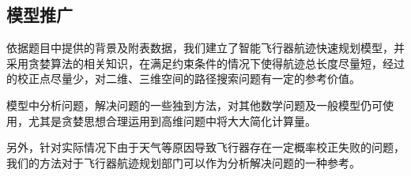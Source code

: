 \subsection{模型推广}

依据题目中提供的背景及附表数据，我们建立了智能飞行器航迹快速规划模型，并采用贪婪算法的相关知识，在满足约束条件的情况下使得航迹总长度尽量短，经过的校正点尽量少，对二维、三维空间的路径搜索问题有一定的参考价值。

模型中分析问题，解决问题的一些独到方法，对其他数学问题及一般模型仍可使用，尤其是贪婪思想合理运用到高维问题中将大大简化计算量。

另外，针对实际情况下由于天气等原因导致飞行器存在一定概率校正失败的问题，我们的方法对于飞行器航迹规划部门可以作为分析解决问题的一种参考。










